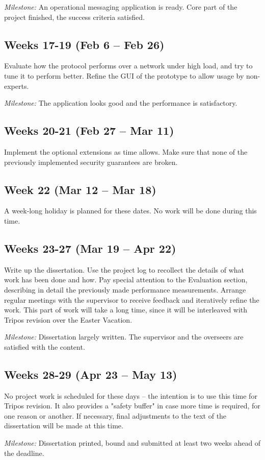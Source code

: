 \documentclass[a4paper, twoside, 12pt]{report}
\begin{document}
\begin{appendices}
\vspace{0.7\baselineskip}
\noindent
\textit{Milestone:} An operational messaging application is ready. Core part of the project finished, the success criteria satisfied.


\subsection*{Weeks 17-19 (Feb 6 -- Feb 26)}
Evaluate how the protocol performs over a network under high load, and try to tune it to perform better. Refine the GUI of the prototype to allow usage by non-experts.

\vspace{0.7\baselineskip}
\noindent
\textit{Milestone:} The application looks good and the performance is satisfactory.

\subsection*{Weeks 20-21 (Feb 27 -- Mar 11)}
Implement the optional extensions as time allows. Make sure that none of the previously implemented security guarantees are broken.

\subsection*{Week 22 (Mar 12 -- Mar 18)}
A week-long holiday is planned for these dates. No work will be done during this time.

\subsection*{Weeks 23-27 (Mar 19 -- Apr 22)}
Write up the dissertation. Use the project log to recollect the details of what work has been done and how. Pay special attention to the Evaluation section, describing in detail the previously made performance measurements. Arrange regular meetings with the supervisor to receive feedback and iteratively refine the work. This part of work will take a long time, since it will be interleaved with Tripos revision over the Easter Vacation.

\vspace{0.7\baselineskip}
\noindent
\textit{Milestone:} Dissertation largely written. The supervisor and the overseers are satisfied with the content.

\subsection*{Weeks 28-29 (Apr 23 -- May 13)}
No project work is scheduled for these days -- the intention is to use this time for Tripos revision. It also provides a "safety buffer" in case more time is required, for one reason or another. If necessary, final adjustments to the text of the dissertation will be made at this time.

\vspace{0.7\baselineskip}
\noindent
\textit{Milestone:} Dissertation printed, bound and submitted at least two weeks ahead of the deadline.
\end{appendices}
\end{document}
